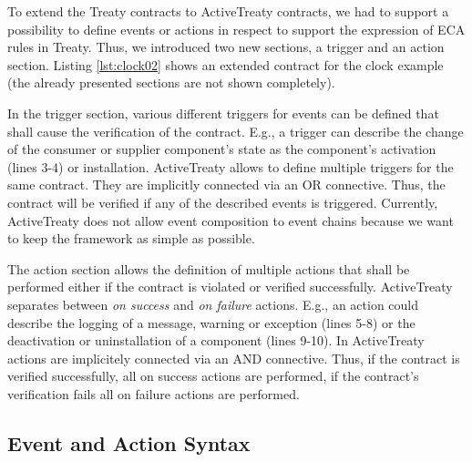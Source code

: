 \documentclass{llncs}
\begin{document}
\begin{figure}[htbp]
\lstset{ 
  language=XML,
  caption=A contract for the clock example.,
  label=lst:clock01
}

\end{figure}

To extend the Treaty contracts to ActiveTreaty contracts, we had to support a possibility to define events or actions in respect to support the expression of ECA rules in Treaty. Thus, we introduced two new sections, a trigger and an action section. Listing \ref{lst:clock02} shows an extended contract for the clock example (the already presented sections are not shown completely).

\begin{figure}[htbp]
\lstset{ 
  language=XML,
  caption=A contract for the clock example including triggers and actions.,
  label=lst:clock02
}

\end{figure}

In the trigger section, various different triggers for events can be defined that shall cause the verification of the contract. E.g., a trigger can describe the change of the consumer or supplier component's state as the component's activation (lines 3-4) or installation. ActiveTreaty allows to define multiple triggers for the same contract. They are implicitly connected via an OR connective. Thus, the contract will be verified if any of the described events is triggered. Currently, ActiveTreaty does not allow event composition to event chains because we want to keep the framework as simple as possible.

The action section allows the definition of multiple actions that shall be performed either if the contract is violated or verified successfully. ActiveTreaty separates between \textit{on success} and \textit{on failure} actions. E.g., an action could describe the logging of a message, warning or exception (lines 5-8) or the deactivation or uninstallation of a component (lines 9-10). In ActiveTreaty actions are implicitely connected via an AND connective. Thus, if the contract is verified successfully, all on success actions are performed, if the contract's verification fails all on failure actions are performed.
	


\subsection{Event and Action Syntax} 
\end{document}
